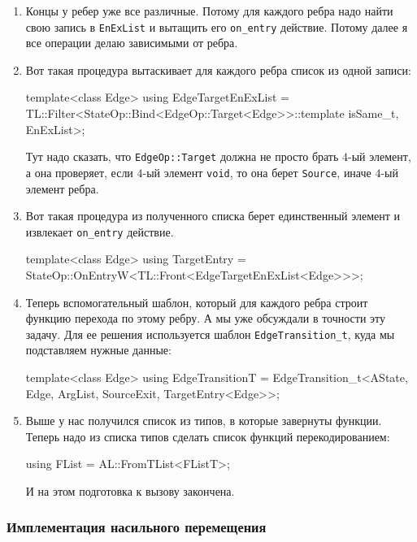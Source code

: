 \documentclass{article}
\begin{document}
{\begin{enumerate}
\item Концы у ребер уже все различные.
Потому для каждого ребра надо найти свою запись в \verb"EnExList" и вытащить его \verb"on_entry" действие.
Потому далее я все операции делаю зависимыми от ребра.

\item Вот такая процедура вытаскивает для каждого ребра список из одной записи:
\begin{cppcode}[\nonumbers]
template<class Edge>
using EdgeTargetEnExList =
    TL::Filter<StateOp::Bind<EdgeOp::Target<Edge>>::template isSame_t, EnExList>;
\end{cppcode}
Тут надо сказать, что \verb"EdgeOp::Target" должна не просто брать $4$-ый элемент, а она проверяет, если $4$-ый элемент \verb"void", то она берет \verb"Source", иначе $4$-ый элемент ребра.

\item Вот такая процедура из полученного списка берет единственный элемент и извлекает \verb"on_entry" действие.
\begin{cppcode}[\nonumbers]
template<class Edge>
using TargetEntry = StateOp::OnEntryW<TL::Front<EdgeTargetEnExList<Edge>>>;
\end{cppcode}

\item Теперь вспомогательный шаблон, который для каждого ребра строит функцию перехода по этому ребру.
А мы уже обсуждали в точности эту задачу.
Для ее решения используется шаблон \verb"EdgeTransition_t", куда мы подставляем нужные данные:
\begin{cppcode}[\nonumbers]
template<class Edge>
using EdgeTransitionT = EdgeTransition_t<AState, Edge, ArgList,
                                         SourceExit, TargetEntry<Edge>>;
\end{cppcode}

\item Выше у нас получился список из типов, в которые завернуты функции.
Теперь надо из списка типов сделать список функций перекодированием:
\begin{cppcode}[\nonumbers]
using FList = AL::FromTList<FListT>;
\end{cppcode}
И на этом подготовка к вызову закончена.
\end{enumerate}

\subsubsection{Имплементация насильного перемещения}

}
\end{document}
